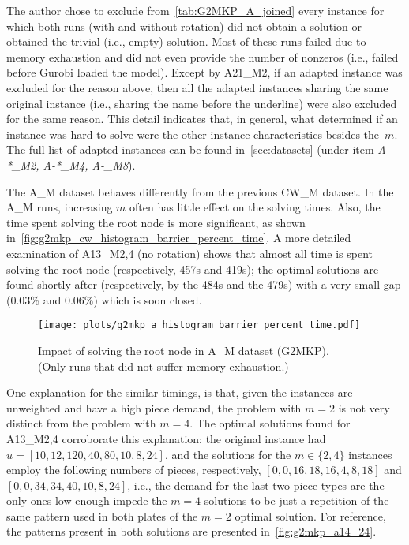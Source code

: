 The author chose to exclude from~\cref{tab:G2MKP_A_joined} every instance for which both runs (with and without rotation) did not obtain a solution or obtained the trivial (i.e., empty) solution.
Most of these runs failed due to memory exhaustion and did not even provide the number of nonzeros (i.e., failed before Gurobi loaded the model).
Except by A21\_M2, if an adapted instance was excluded for the reason above, then all the adapted instances sharing the same original instance (i.e., sharing the name before the underline) were also excluded for the same reason.
This detail indicates that, in general, what determined if an instance was hard to solve were the other instance characteristics besides the~\(m\).
The full list of adapted instances can be found in~\cref{sec:datasets} (under item \emph{A-*\_M2, A-*\_M4, A-\_M8}).

The A\_M dataset behaves differently from the previous CW\_M dataset.
In the A\_M runs, increasing \(m\) often has little effect on the solving times.
Also, the time spent solving the root node is more significant, as shown in~\cref{fig:g2mkp_cw_histogram_barrier_percent_time}.
A more detailed examination of A13\_M{2,4} (no rotation) shows that almost all time is spent solving the root node (respectively, 457s and 419s); the optimal solutions are found shortly after (respectively, by the 484s and the 479s) with a very small gap (0.03\% and 0.06\%) which is soon closed.

\begin{figure}[!t]
  \caption{Impact of solving the root node in A\_M dataset (G2MKP).\\(Only runs that did not suffer memory exhaustion.)}
  \center
  \texttt{[image: plots/g2mkp\_a\_histogram\_barrier\_percent\_time.pdf]}
  \label{fig:g2mkp_a_histogram_barrier_percent_time}
\end{figure}

One explanation for the similar timings, is that, given the instances are unweighted and have a high piece demand, the problem with \(m = 2\) is not very distinct from the problem with \(m = 4\).
The optimal solutions found for A13\_M{2,4} corroborate this explanation: the original instance had \(u = [10, 12, 120, 40, 80, 10, 8, 24]\), and the solutions for the \(m \in \{2, 4\}\) instances employ the following numbers of pieces, respectively, \([0, 0, 16, 18, 16, 4, 8, 18]\) and \([0, 0, 34, 34, 40, 10, 8, 24]\), i.e., the demand for the last two piece types are the only ones low enough impede the \(m = 4\) solutions to be just a repetition of the same pattern used in both plates of the \(m = 2\) optimal solution. For reference, the patterns present in both solutions are presented in~\cref{fig:g2mkp_a14_24}.

